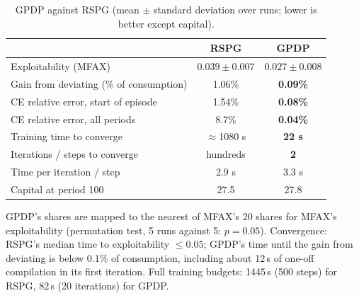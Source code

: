 \documentclass[11pt,a4paper]{article}
\begin{document}
\begin{table}[h]
\centering
\small
\caption{GPDP against RSPG (mean $\pm$ standard deviation over runs; lower is better except capital).}
\label{tab:main}
\begin{tabular}{lcc}
\toprule
 & RSPG & \textbf{GPDP} \\
\midrule
Exploitability (MFAX)                         & $0.039 \pm 0.007$ & $\mathbf{0.027 \pm 0.008}$ \\
Gain from deviating (\% of consumption)       & 1.06\%  & \textbf{0.09\%} \\
CE relative error, start of episode           & 1.54\%  & \textbf{0.08\%} \\
CE relative error, all periods                & 8.7\%   & \textbf{0.04\%} \\
Training time to converge                     & $\approx$1080 s & \textbf{22 s} \\
Iterations / steps to converge                & hundreds & \textbf{2} \\
Time per iteration / step                     & 2.9 s   & 3.3 s \\
Capital at period 100                         & 27.5    & 27.8 \\
\bottomrule
\end{tabular}

\smallskip
\begin{minipage}{0.92\linewidth}\footnotesize
GPDP's shares are mapped to the nearest of MFAX's 20 shares for MFAX's exploitability (permutation
test, 5 runs against 5: $p = 0.05$). Convergence: RSPG's median time to exploitability $\le 0.05$;
GPDP's time until the gain from deviating is below 0.1\% of consumption, including about 12\,s of
one-off compilation in its first iteration. Full training budgets: 1445\,s (500 steps) for RSPG,
82\,s (20 iterations) for GPDP.
\end{minipage}
\end{table}
\end{document}
